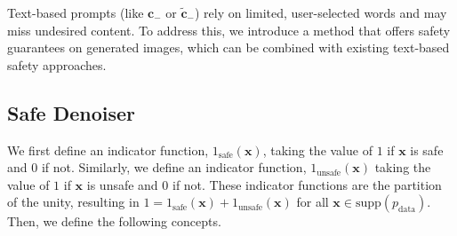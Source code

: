 Text-based prompts (like $\mathbf{c}_{-}$ or $\tilde{\mathbf{c}}_{-}$) rely on limited, user-selected words and may miss undesired content. To address this, we introduce a method that 
offers safety guarantees on generated images, 
which can be combined with existing text-based safety approaches.


\subsection{Safe Denoiser}\label{sec:safe}


We first define an indicator function,  $1_{\text{safe}}(\mathbf{x})$, taking the value of $1$ if $\mathbf{x}$ is safe and $0$ if not. Similarly, we define an indicator function, $1_{\text{unsafe}}(\mathbf{x})$ taking the value of $1$ if $\mathbf{x}$ is unsafe and $0$ if not. 
These indicator functions are the partition of the unity, resulting in $1= 1_{\text{safe}}(\mathbf{x}) + 1_{\text{unsafe}}(\mathbf{x})$ for all $\mathbf{x}\in \text{supp}(p_{\text{data}})$. Then, we define the following concepts.
